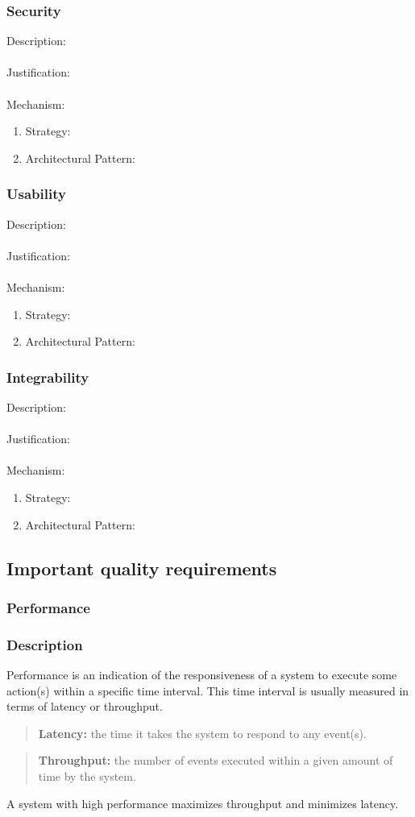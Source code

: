 \documentclass[a4paper,12pt,titlepage]{article}
\begin{document}
\subsubsection{Security}%
	Description: \\\\
	Justification: \\\\
	Mechanism:
	\begin{enumerate}
		\item Strategy: 
		\item Architectural Pattern:
	\end{enumerate}
\subsubsection{Usability}%
	Description: \\\\
	Justification: \\\\
	Mechanism:
	\begin{enumerate}
		\item Strategy: 
		\item Architectural Pattern:
	\end{enumerate}
\subsubsection{Integrability}%
	Description: \\\\
	Justification: \\\\
	Mechanism:
	\begin{enumerate}
		\item Strategy: 
		\item Architectural Pattern:
	\end{enumerate}
\newpage
\subsection{Important quality requirements}
\subsubsection{Performance}%
	\subsubsection*{Description}
	Performance is an indication of the responsiveness of a system to execute some action(s) within a specific time interval. This time interval is usually measured in terms of latency or throughput. 
	\begin{quote}
		\textbf{Latency:} the time it takes the system to respond to any event(s).
	\end{quote} 
	\begin{quote}
		\textbf{Throughput:} the number of events executed within a given amount of time by the system.
	\end{quote} 
	A system with high performance maximizes throughput and minimizes latency.
\end{document}
